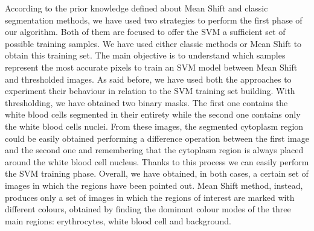 \documentclass[final,a4paper,12pt,english]{UnicaPhdThesis3}
\begin{document}
According to the prior knowledge defined about Mean Shift and classic segmentation methods, we have used two strategies to perform the first phase of our algorithm. Both of them are focused to offer the SVM a sufficient set of possible training samples. We have used either classic methods or Mean Shift to obtain this training set. The main objective is to understand which samples represent the most accurate pixels to train an SVM model between Mean Shift and thresholded images. As said before, we have used both the approaches to experiment their behaviour in relation to the SVM training set building. With thresholding, we have obtained two binary masks. The first one contains the white blood cells segmented in their entirety while the second one contains only the white blood cells nuclei.
From these images, the segmented cytoplasm region could be easily obtained performing a difference operation between the first image and the second one and remembering that the cytoplasm region is always placed around the white blood cell nucleus. Thanks to this process we can easily perform the SVM training phase. Overall, we have obtained, in both cases, a certain set of images in which the regions have been pointed out. Mean Shift method, instead, produces only a set of images in which the regions of interest are marked with different colours, obtained by finding the dominant colour modes of the three main regions: erythrocytes, white blood cell and background. 
\end{document}
